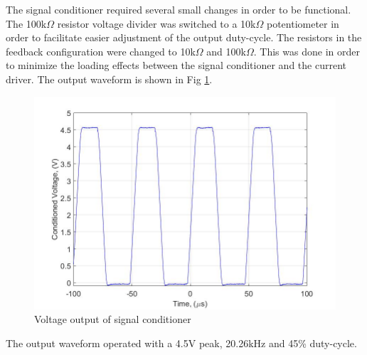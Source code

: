 
The signal conditioner required several small changes in order to be functional. The 100k$\Omega$ resistor voltage divider was switched to a 10k$\Omega$ potentiometer in order to facilitate easier adjustment of the output duty-cycle. The resistors in the feedback configuration were changed to 10k$\Omega$ and 100k$\Omega$. This was done in order to minimize the loading effects between the signal conditioner and the current driver. The output waveform is shown in Fig \ref{fig:conditionedvoltagelab4}.

\begin{figure}
	\centering
	\includegraphics[width=0.7\linewidth]{ExperimentalImplementation/conditioned_voltage_lab4}
	\caption[Experimental signal conditioner]{Voltage output of signal conditioner}
	\label{fig:conditionedvoltagelab4}
\end{figure}

The output waveform operated with a 4.5V peak, 20.26kHz and 45\% duty-cycle.

